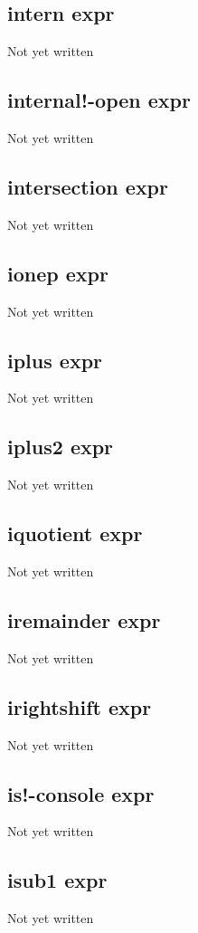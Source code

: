 \documentclass[a4paper,11pt]{article}
\begin{document}
\subsection{\ttfamily intern expr}
Not yet written

\subsection{\ttfamily internal!-open expr}
Not yet written

\subsection{\ttfamily intersection expr}
Not yet written

\subsection{\ttfamily ionep expr}
Not yet written

\subsection{\ttfamily iplus expr}
Not yet written

\subsection{\ttfamily iplus2 expr}
Not yet written

\subsection{\ttfamily iquotient expr}
Not yet written

\subsection{\ttfamily iremainder expr}
Not yet written

\subsection{\ttfamily irightshift expr}
Not yet written

\subsection{\ttfamily is!-console expr}
Not yet written

\subsection{\ttfamily isub1 expr}
Not yet written
\end{document}
